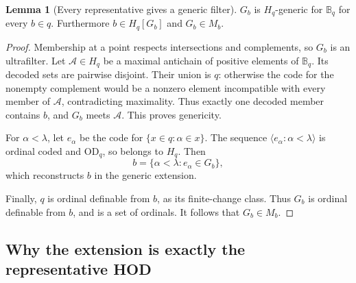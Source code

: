 \documentclass[11pt,letterpaper]{article}
\theoremstyle{definition}
\newtheorem{lemma}[definition]{Lemma}
\numberwithin{equation}{section}
\newcommand{\OD}{\mathrm{OD}}
\newcommand{\BB}{\mathbb B}
\begin{document}
\begin{lemma}[Every representative gives a generic filter]\label{lem:pointgeneric}
$G_b$ is $H_q$-generic for $\BB_q$ for every $b\in q$.
Furthermore $b\in H_q[G_b]$ and $G_b\in M_b$.
\end{lemma}
\begin{proof}
Membership at a point respects intersections and complements, so $G_b$
is an ultrafilter. Let $\mathcal A\in H_q$ be a maximal antichain of
positive elements of $\BB_q$. Its decoded sets are pairwise disjoint.
Their union is $q$: otherwise the code for the nonempty complement would
be a nonzero element incompatible with every member of $\mathcal A$,
contradicting maximality. Thus exactly one decoded member contains $b$,
and $G_b$ meets $\mathcal A$. This proves genericity.

For $\alpha<\lambda$, let $e_\alpha$ be the code for
$\{x\in q:\alpha\in x\}$. The sequence
$\langle e_\alpha:\alpha<\lambda\rangle$ is ordinal coded and $\OD_q$,
so belongs to $H_q$. Then
\[
 b=\{\alpha<\lambda:e_\alpha\in G_b\},
\]
which reconstructs $b$ in the generic extension.

Finally, $q$ is ordinal definable from $b$, as its finite-change class.
Thus $G_b$ is ordinal definable from $b$, and is a set of ordinals.
It follows that $G_b\in M_b$.
\end{proof}

\subsection{Why the extension is exactly the representative HOD}
\end{document}

